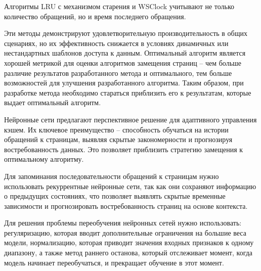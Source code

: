 Алгоритмы LRU с механизмом старения и WSClock учитывают не только количество обращений, но и время последнего обращения.

Эти методы демонстрируют удовлетворительную производительность в общих сценариях, но их эффективность снижается в условиях динамичных или нестандартных шаблонов доступа к данным.
Оптимальный алгоритм является хорошей метрикой для оценки алгоритмов замещения страниц -- чем больше различие результатов разработанного метода и оптимального, тем больше возможностей для улучшения разработанного алгоритма.
Таким образом, при разработке метода необходимо стараться приблизить его к результатам, которые выдает оптимальный алгоритм.

Нейронные сети предлагают перспективное решение для адаптивного управления кэшем.
Их ключевое преимущество -- способность обучаться на истории обращений к страницам, выявляя скрытые закономерности и прогнозируя востребованность данных. 
Это позволяет приблизить стратегию замещения к оптимальному алгоритму. 

Для запоминания последовательности обращений к страницам нужно использовать рекуррентные нейронные сети, так как они сохраняют информацию о предыдущих состояниях, что позволяет выявлять скрытые временные зависимости и прогнозировать востребованность страниц на основе контекста.

Для решения проблемы переобучения нейронных сетей нужно использовать: регуляризацию, которая вводит дополнительные ограничения на большие веса модели, нормализацию, которая приводит значения входных признаков к одному диапазону, а также метод раннего останова, который отслеживает момент, когда модель начинает переобучаться, и прекращает обучение в этот момент.
